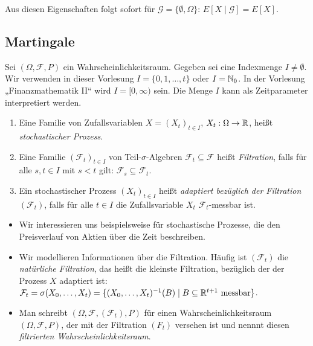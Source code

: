 \documentclass[a4paper,twoside,DIV15,BCOR12mm]{scrbook}
\newcommand{\cF}{\mathcal F}
\begin{document}
Aus diesen Eigenschaften folgt sofort für $\mathcal G = \{\emptyset, \Omega\}$: $E[X\mid\mathcal G] = E[X]$.


\subsection{Martingale}

Sei $(\Omega, \cF, P)$ ein Wahrscheinlichkeitsraum. Gegeben sei eine Indexmenge $I\ne \emptyset$. Wir verwenden in dieser Vorlesung $I=\{0, 1,\ldots,t\}$ oder $I=\mathbb{N}_0$. In der Vorlesung „Finanzmathematik II“ wird $I=[0,\infty)$ sein. Die Menge $I$ kann als Zeitparameter interpretiert werden.

\begin{definition}
\begin{enumerate}
\item Eine Familie von Zufallsvariablen $X=(X_t)_{t\in I}$, $X_t:\Omega \to \mathbb{R}$, heißt \emph{stochastischer Prozess}.
\item Eine Familie $(\cF_t)_{t\in I}$ von Teil-$\sigma$-Algebren $\cF_t \subseteq \cF$ heißt \emph{Filtration}, falls für alle $s,t\in I$ mit $s<t$ gilt: $\cF_s \subseteq \cF_t$.
\item Ein stochastischer Prozess $(X_t)_{t\in I}$ heißt \emph{adaptiert bezüglich der Filtration $(\cF_t)$},  falls für alle $t\in I$ die Zufallsvariable $X_t$ $\cF_t$-messbar ist.
\end{enumerate}
\end{definition}

\begin{bemerkung}
\begin{itemize}
\item Wir interessieren uns beispielsweise für stochastische Prozesse, die den Preisverlauf von Aktien über die Zeit beschreiben.
\item Wir modellieren Informationen über die Filtration. Häufig ist $(\cF_t)$ die \emph{natürliche Filtration}, das heißt die kleinste Filtration, bezüglich der der Prozess $X$ adaptiert ist: $\cF_t = \sigma(X_0,\ldots,X_t) = \{(X_0,\ldots,X_t)^{-1}(B)\mid B\subseteq \MdR^{t+1} \text{ messbar}\}$.
\item Man schreibt $(\Omega, \cF, (\cF_t), P)$ für einen Wahrscheinlichkeitsraum $(\Omega, \cF, P)$, der mit der Filtration $(F_t)$ versehen ist und nennnt diesen \emph{filtrierten Wahrscheinlichkeitsraum}.
\end{itemize}
\end{bemerkung}
\end{document}
